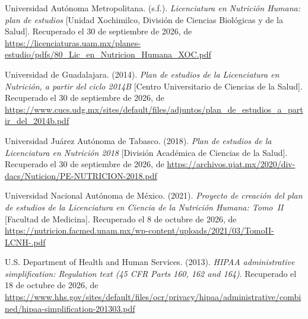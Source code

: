 \documentclass[12pt, a4paper]{article}
\begin{document}
\begin{list}{}{\setlength{\leftmargin}{1.27cm}\setlength{\itemindent}{-1.27cm}%
  \setlength{\labelwidth}{0pt}\setlength{\labelsep}{0pt}\setlength{\itemsep}{6pt}}
\item Universidad Autónoma Metropolitana. (s.f.). \textit{Licenciatura en
  Nutrición Humana: plan de estudios} [Unidad Xochimilco, División de
  Ciencias Biológicas y de la Salud].
  Recuperado el 30 de septiembre de 2026, de \url{https://licenciaturas.uam.mx/planes-estudio/pdfs/80_Lic_en_Nutricion_Humana_XOC.pdf}
 
 
\item Universidad de Guadalajara. (2014). \textit{Plan de estudios de la
  Licenciatura en Nutrición, a partir del ciclo 2014B} [Centro
  Universitario de Ciencias de la Salud].
Recuperado el 30 de septiembre de 2026, de \url{https://www.cucs.udg.mx/sites/default/files/adjuntos/plan_de_estudios_a_partir_del_2014b.pdf}
 
 
\item Universidad Juárez Autónoma de Tabasco. (2018). \textit{Plan de estudios
  de la Licenciatura en Nutrición 2018} [División Académica de Ciencias
  de la Salud].
  Recuperado el 30 de septiembre de 2026, de \url{https://archivos.ujat.mx/2020/div-dacs/Nuticion/PE-NUTRICION-2018.pdf}
 
 
\item Universidad Nacional Autónoma de México. (2021). \textit{Proyecto de
  creación del plan de estudios de la Licenciatura en Ciencia de la
  Nutrición Humana: Tomo~II} [Facultad de Medicina].
  Recuperado el 8 de octubre de 2026, de \url{https://nutricion.facmed.unam.mx/wp-content/uploads/2021/03/TomoII-LCNH-.pdf}
 
 
\item U.S. Department of Health and Human Services. (2013).
  \textit{HIPAA administrative simplification: Regulation text
  (45 CFR Parts 160, 162 and 164)}. Recuperado el 18 de octubre de 2026, de \url{https://www.hhs.gov/sites/default/files/ocr/privacy/hipaa/administrative/combined/hipaa-simplification-201303.pdf}


\end{list}
\end{document}
